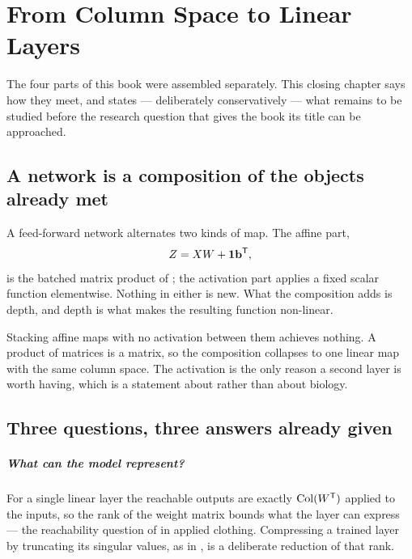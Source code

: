 \setchapterpreamble[u]{\margintoc}
\chapter{From Column Space to Linear Layers}


The four parts of this book were assembled separately. This closing chapter says
how they meet, and states --- deliberately conservatively --- what remains to be
studied before the research question that gives the book its title can be
approached.

\section{A network is a composition of the objects already met}

A feed-forward network alternates two kinds of map. The affine part,
\[
	Z=XW+\mathbf{1}\mathbf{b}^{\mathsf{T}},
\]
is the batched matrix product of ; the activation part applies a
fixed scalar function elementwise. Nothing in either is new. What the
composition adds is depth, and depth is what makes the resulting function
non-linear.

\begin{remark}
Stacking affine maps with no activation between them achieves nothing. A
product of matrices is a matrix, so the composition collapses to one linear map
with the same column space. The activation is the only reason a second layer is worth
having, which is a statement about  rather than about biology.
\end{remark}

\section{Three questions, three answers already given}

\paragraph{What can the model represent?}
For a single linear layer the reachable outputs are exactly \(\operatorname{Col}(W^{\mathsf{T}})\)
applied to the inputs, so the rank of the weight matrix bounds what the layer can
express --- the reachability question of  in applied
clothing. Compressing a trained layer by truncating its singular values, as in
, is a deliberate reduction of that rank.

